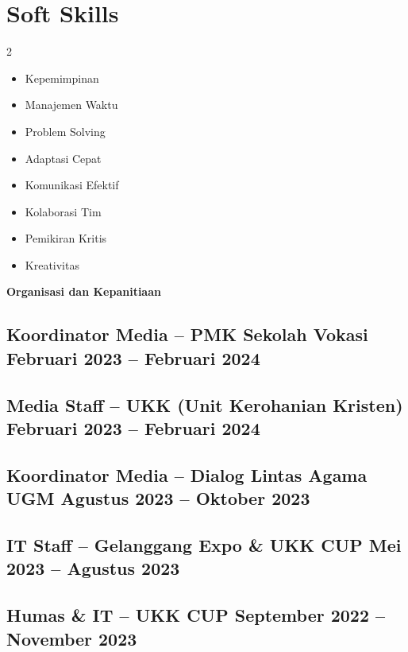 \documentclass[a4paper,11pt]{article}
\begin{document}
{	%
	\section*{Soft Skills}
	\begin{multicols}{2}
		\begin{itemize}
			\item Kepemimpinan
			\item Manajemen Waktu
			\item Problem Solving
			\item Adaptasi Cepat
			\item Komunikasi Efektif
			\item Kolaborasi Tim
			\item Pemikiran Kritis
			\item Kreativitas
		\end{itemize}
	\end{multicols}
	
	\medskip
	\begin{center}
		{\large\bfseries Organisasi dan Kepanitiaan}\\[-0.6em]
		\noindent\makebox[\linewidth]{\rule{\textwidth}{0.4pt}}
	\end{center}
	
	\subsection{\textnormal{Koordinator Media – PMK Sekolah Vokasi \hfill Februari 2023 – Februari 2024}}	
	\subsection{\textnormal{Media Staff – UKK (Unit Kerohanian Kristen) \hfill Februari 2023 – Februari 2024}}	
	\subsection{\textnormal{Koordinator Media – Dialog Lintas Agama UGM \hfill Agustus 2023 – Oktober 2023}}	
	\subsection{\textnormal{IT Staff – Gelanggang Expo \& UKK CUP \hfill Mei 2023 – Agustus 2023}}	
	\subsection{\textnormal{Humas \& IT – UKK CUP \hfill September 2022 – November 2023}}	
	
}
\end{document}
